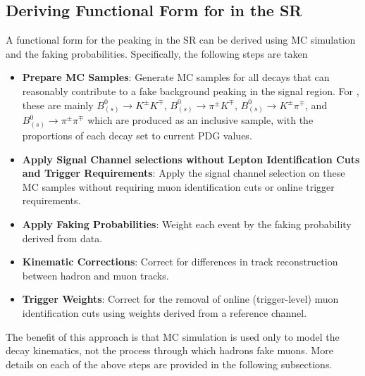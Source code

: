 \subsection{Deriving Functional Form for \Bhh in the SR}
\label{subsec:BhhFunctionalForm}

A functional form for the peaking \Bhh in the SR can be derived using MC simulation and the faking probabilities.
Specifically, the following steps are taken 
\begin{itemize}
    \item \textbf{Prepare MC Samples}: Generate MC samples for all decays that can reasonably contribute to a fake background peaking in the signal region. For \Bmumu, these are mainly \( B_{(s)}^0 \rightarrow K^\pm K^\mp \), \( B_{(s)}^0 \rightarrow \pi^\pm K^\mp \), \( B_{(s)}^0 \rightarrow K^\pm \pi^\mp \), and \( B_{(s)}^0 \rightarrow \pi^\pm \pi^\mp \) which are produced as an inclusive \Bhh sample, with the proportions of each decay set to current PDG values.
    \item \textbf{Apply Signal Channel selections without Lepton Identification Cuts and Trigger Requirements}: Apply the signal channel selection on these MC samples without requiring muon identification cuts or online trigger requirements. 
    \item \textbf{Apply Faking Probabilities}: Weight each event by the faking probability derived from data.
    \item \textbf{Kinematic Corrections}: Correct for differences in track reconstruction between hadron and muon tracks.
    \item \textbf{Trigger Weights}: Correct for the removal of online (trigger-level) muon identification cuts using weights derived from a reference channel.
\end{itemize}

The benefit of this approach is that MC simulation is used only to model the decay kinematics, not the process through which hadrons fake muons. 
More details on each of the above steps are provided in the following subsections.

